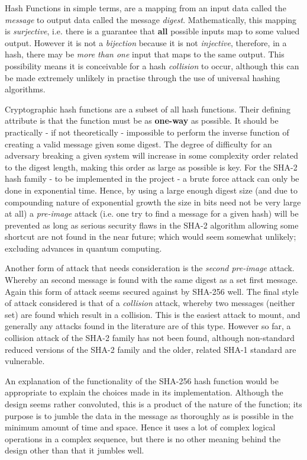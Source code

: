 Hash Functions in simple terms, are a mapping from an input data called the
\emph{message} to output data called the message \emph{digest}.
Mathematically, this mapping is \emph{surjective}, i.e. there is a guarantee
that \textbf{all} possible inputs map to some valued output.
However it is not a \emph{bijection} because it is not \emph{injective},
therefore, in a hash, there may be \emph{more than one} input that maps to
the same output.
This possibility means it is conceivable for a hash \emph{collision} to occur,
although this can be made extremely unlikely in practise through the use of
universal hashing algorithms.

Cryptographic hash functions are a subset of all hash functions.
Their defining attribute is that the function must be as \textbf{one-way} as
possible.
It should be practically - if not theoretically - impossible to perform the
inverse function of creating a valid message given some digest.
The degree of difficulty for an adversary breaking a given system will increase
in some complexity order related to the digest length, making this order as
large as possible is key.
For the SHA-2 hash family - to be implemented in the project - a brute force
attack can only be done in exponential time.
Hence, by using a large enough digest size (and due to compounding nature of
exponential growth the size in bits need not be very large at all) a 
\emph{pre-image} attack (i.e. one try to find a message for a given hash)
will be prevented as long as serious security flaws in the SHA-2 algorithm
allowing some shortcut are not found in the near future; which would seem
somewhat unlikely; excluding advances in quantum computing.

Another form of attack that needs consideration is the
\emph{second pre-image} attack.
Whereby an second message is found with the same digest as a set first message.
Again this form of attack seems secured against by SHA-256 well.
The final style of attack considered is that of a \emph{collision} attack,
whereby two messages (neither set) are found which result in a collision.
This is the easiest attack to mount, and generally any attacks found in the
literature are of this type. However so far, a collision attack of the SHA-2
family has not been found, although non-standard reduced versions of the
SHA-2 family and the older, related SHA-1 standard are 
vulnerable\cite{sanadhya2009combinatorial}.

An explanation of the functionality of the SHA-256 hash function would be
appropriate to explain the choices made in its implementation.
Although the design seems rather convoluted, this is a product of the nature of
the function; its purpose is to jumble the data in the message as thoroughly as
is possible in the minimum amount of time and space.
Hence it uses a lot of complex logical operations in a complex sequence, but
there is no other meaning behind the design other than that it jumbles well.

